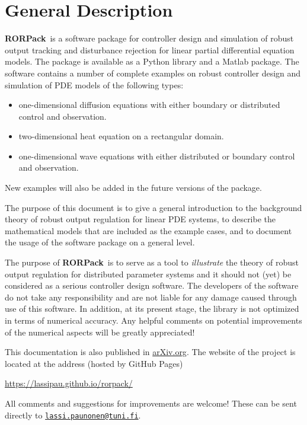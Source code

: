 \documentclass[11pt, a4paper]{amsart}
\newcommand{\COMMapproxRC}[1]{{\color{gray}#1}}
\renewcommand{\COMMapproxRC}[1]{}
\theoremstyle{definition}
\numberwithin{equation}{section}
\newcommand{\RORname}{\textbf{RORPack}}
\begin{document}
\section{General Description}

\RORname\ is a software package
for controller design and simulation of robust output tracking and disturbance rejection for linear partial differential equation models. 
The package is available as a Python library and a Matlab package.
The software contains a number of complete examples on robust controller design and simulation of PDE models
of the following types:
\begin{itemize}
  \item one-dimensional diffusion equations with either boundary or distributed control and observation.
  \item two-dimensional heat equation on a rectangular domain.
  \item one-dimensional wave equations with either distributed or boundary control and observation.
    \COMMapproxRC{
    \item two-dimensional wave equation on an annulus with boundary control and observation
    }
\end{itemize}
New examples will also be added in the future versions of the package.

The purpose of this document is to give a general introduction to the background theory of robust output regulation for linear PDE systems, to describe the mathematical models that are included as the example cases, and to document the usage of the software package on a general level.
 
The purpose of \RORname\ is to serve as a tool to \textit{illustrate} the theory of robust output regulation for distributed parameter systems and it should not (yet) be considered as a serious controller design software. 
The developers of the software do not take any responsibility and are not liable for any damage caused through use of this software.
In addition, at its present stage, the library is not optimized in terms of numerical accuracy. Any helpful comments on potential improvements of the numerical aspects will be greatly appreciated!

  This documentation is also published in \href{https://arxiv.org/}{arXiv.org}.
The website of the project is located at the address (hosted by GitHub Pages)
\begin{center}
  \href{https://lassipau.github.io/rorpack/}{https://lassipau.github.io/rorpack/}
\end{center}
All comments and suggestions for improvements are welcome! These can be sent directly to \texttt{\href{mailto:lassi.paunonen@tuni.fi}{lassi.paunonen@tuni.fi}}.
\end{document}
